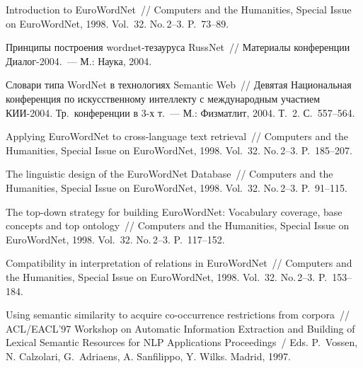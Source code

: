 \begin{multicols}{2}
{{\begin{thebibliography}{99}
Introduction to EuroWordNet~// Com\-puters and the Humanities, Special Issue on EuroWordNet, 1998. Vol.~32. 
No.\,2--3.  P.~73--89. 

Принципы построения wordnet-тезауруса RussNet~// Материалы конференции 
Диалог-2004.~--- М.: Наука, 2004.

Словари типа WordNet в технологиях Semantic Web~// Девятая Национальная 
конференция по искусственному интеллекту с международным участием 
КИИ-2004. Тр.\ конференции в 3-х т.~--- М.: Физматлит, 2004. Т.~2. 
С.~557--564.

Applying EuroWordNet to cross-language text retrieval~// Com\-puters and the 
Humanities, Special Issue on EuroWordNet, 1998. Vol.~32. No.\,2--3.  P.~185--207.

The linguistic design of the EuroWordNet Database~// Com\-puters and the 
Humanities, Special Issue on EuroWordNet, 1998. Vol.~32. No.\,2--3.  P.~91--115.

The top-down strategy for building EuroWordNet: Vocabulary coverage, base 
concepts and top ontology~// Com\-puters and the Humanities, Special Issue on EuroWordNet, 1998. Vol.~32. 
No.\,2--3.  P.~117--152.

\label{end\stat}

Compatibility in interpretation of relations in EuroWordNet~// Com\-puters and the 
Humanities, Special Issue on EuroWordNet, 1998. Vol.~32. No.\,2--3.  P.~153--184.

Using semantic similarity to acquire co-occurrence restrictions from corpora~// 
ACL/EACL'97 Workshop on Automatic Information Extraction 
and Building of Lexical Semantic Resources for NLP Applications Proceedings~/ 
Eds. P.~Vossen, N. Calzolari, G.~Adriaens, A. Sanfilippo, Y. Wilks.
Madrid, 1997.
\end{thebibliography}
}
}
\end{multicols}






 
 
 
 